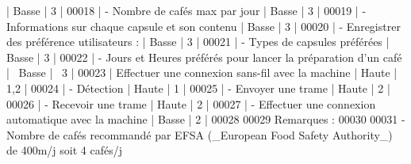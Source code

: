 \begin{DoxyCode}
              |    Basse     |      3      |
00018 |   - Nombre de cafés max par jour                                                                    
              |    Basse     |      3      |
00019 |   - Informations sur chaque capsule et son contenu                                                  
              |    Basse     |      3      |
00020 | - Enregistrer des préférence utilisateurs :                                                         
              |    Basse     |      3      |
00021 |   - Types de capsules préférées                                                                     
              |    Basse     |      3      |
00022 |   - Jours et Heures préférés pour lancer la préparation d'un café                                   
              |    Basse     |      3      | 
00023 | Effectuer une connexion sans-fil avec la machine                                                    
              |    Haute     |     1,2     |
00024 | - Détection                                                                                         
              |    Haute     |      1      |
00025 | - Envoyer une trame                                                                                 
              |    Haute     |      2      |
00026 | - Recevoir une trame                                                                                
              |    Haute     |      2      |
00027 | - Effectuer une connexion automatique avec la machine                                               
              |    Basse     |      2      |
00028 
00029 Remarques :
00030 
00031 - Nombre de cafés recommandé par EFSA (\_European Food Safety Authority\_) de 400m/j soit 4 cafés/j
\end{DoxyCode}
